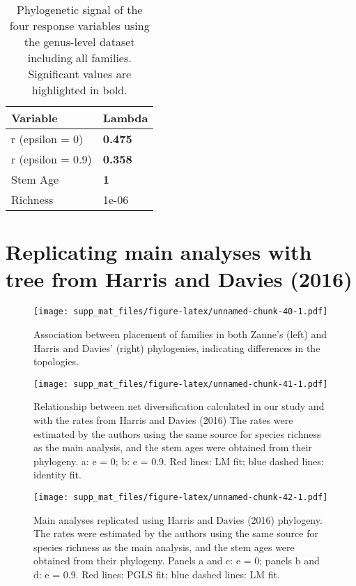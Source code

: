 \documentclass[]{article}
\begin{document}
\begin{table}[H]

\caption{\label{tab:unnamed-chunk-38}Phylogenetic signal of the four response variables using the genus-level dataset including all families. Significant values are highlighted in bold.}
\centering
\begin{tabular}{l|l}
\hline
Variable & Lambda\\
\hline
r (epsilon = 0) & \textbf{0.475}\\
\hline
r (epsilon = 0.9) & \textbf{0.358}\\
\hline
Stem Age & \textbf{1}\\
\hline
Richness & 1e-06\\
\hline
\end{tabular}
\end{table}

\hypertarget{replicating-main-analyses-with-tree-from-harris-and-davies-2016}{%
\section{Replicating main analyses with tree from Harris and Davies
(2016)}\label{replicating-main-analyses-with-tree-from-harris-and-davies-2016}}

\begin{figure}
\centering
\texttt{[image: supp\_mat\_files/figure-latex/unnamed-chunk-40-1.pdf]}
\caption{Association between placement of families in both Zanne's
(left) and Harris and Davies' (right) phylogenies, indicating
differences in the topologies.}
\end{figure}

\begin{figure}
\centering
\texttt{[image: supp\_mat\_files/figure-latex/unnamed-chunk-41-1.pdf]}
\caption{Relationship between net diversification calculated in our
study and with the rates from Harris and Davies (2016) The rates were
estimated by the authors using the same source for species richness as
the main analysis, and the stem ages were obtained from their phylogeny.
a: e = 0; b: e = 0.9. Red lines: LM fit; blue dashed lines: identity
fit.}
\end{figure}

\begin{figure}
\centering
\texttt{[image: supp\_mat\_files/figure-latex/unnamed-chunk-42-1.pdf]}
\caption{Main analyses replicated using Harris and Davies (2016)
phylogeny. The rates were estimated by the authors using the same source
for species richness as the main analysis, and the stem ages were
obtained from their phylogeny. Panels a and c: e = 0; panels b and d: e
= 0.9. Red lines: PGLS fit; blue dashed lines: LM fit.}
\end{figure}
\end{document}

